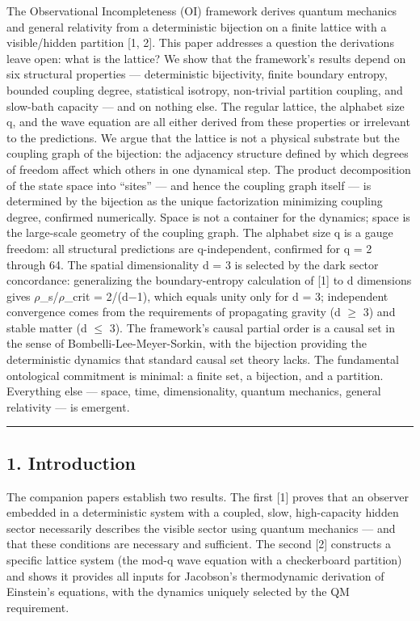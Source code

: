 \documentclass[
  11pt,
]{article}
\begin{document}
The Observational Incompleteness (OI) framework derives quantum
mechanics and general relativity from a deterministic bijection on a
finite lattice with a visible/hidden partition {[}1, 2{]}. This paper
addresses a question the derivations leave open: what is the lattice? We
show that the framework's results depend on six structural properties
--- deterministic bijectivity, finite boundary entropy, bounded coupling
degree, statistical isotropy, non-trivial partition coupling, and
slow-bath capacity --- and on nothing else. The regular lattice, the
alphabet size q, and the wave equation are all either derived from these
properties or irrelevant to the predictions. We argue that the lattice
is not a physical substrate but the coupling graph of the bijection: the
adjacency structure defined by which degrees of freedom affect which
others in one dynamical step. The product decomposition of the state
space into ``sites'' --- and hence the coupling graph itself --- is
determined by the bijection as the unique factorization minimizing
coupling degree, confirmed numerically. Space is not a container for the
dynamics; space is the large-scale geometry of the coupling graph. The
alphabet size q is a gauge freedom: all structural predictions are
q-independent, confirmed for q = 2 through 64. The spatial
dimensionality d = 3 is selected by the dark sector concordance:
generalizing the boundary-entropy calculation of {[}1{]} to d dimensions
gives \ensuremath{\rho}\_s/\ensuremath{\rho}\_crit = 2/(d\ensuremath{-}1), which equals unity only for d = 3;
independent convergence comes from the requirements of propagating
gravity (d \ensuremath{\geq} 3) and stable matter (d \ensuremath{\leq} 3). The framework's causal
partial order is a causal set in the sense of Bombelli-Lee-Meyer-Sorkin,
with the bijection providing the deterministic dynamics that standard
causal set theory lacks. The fundamental ontological commitment is
minimal: a finite set, a bijection, and a partition. Everything else ---
space, time, dimensionality, quantum mechanics, general relativity ---
is emergent.

\begin{center}\rule{0.5\linewidth}{0.5pt}\end{center}

\hypertarget{introduction}{%
\subsection{1. Introduction}\label{introduction}}

The companion papers establish two results. The first {[}1{]} proves
that an observer embedded in a deterministic system with a coupled,
slow, high-capacity hidden sector necessarily describes the visible
sector using quantum mechanics --- and that these conditions are
necessary and sufficient. The second {[}2{]} constructs a specific
lattice system (the mod-q wave equation with a checkerboard partition)
and shows it provides all inputs for Jacobson's thermodynamic derivation
of Einstein's equations, with the dynamics uniquely selected by the QM
requirement.
\end{document}

